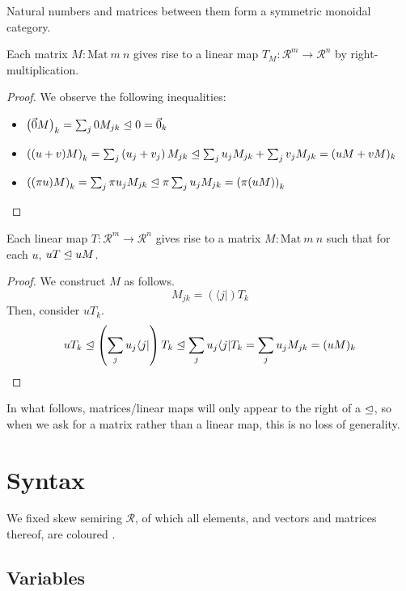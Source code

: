 \documentclass[submission,copyright,creativecommons]{eptcs}
\begin{document}
\begin{lemma}
  Natural numbers and matrices between them form a symmetric monoidal category.
\end{lemma}

\begin{lemma}
  Each matrix $M : \mathrm{Mat}~m~n$ gives rise to a linear map
  $T_M : \mathscr R^m \to \mathscr R^n$ by right-multiplication.
\end{lemma}
\begin{proof}
  We observe the following inequalities:
  \begin{itemize}
  \item $\left(\vec 0M\right)_{k} = \sum_j 0M_{jk} \trianglelefteq 0 = \vec 0_{k}$
  \item $\left((u + v)M\right)_{k} = \sum_j \left(u_j + v_j\right)M_{jk} \trianglelefteq
    \sum_j u_jM_{jk} + \sum_j v_jM_{jk} = (uM + vM)_{k}$
  \item $\left((\pi u)M\right)_{k} = \sum_j \pi u_jM_{jk} \trianglelefteq
    \pi\sum_j u_jM_{jk} = \left(\pi(uM)\right)_{k}$
  \end{itemize}
\end{proof}

\begin{lemma}
  Each linear map $T : \mathscr R^m \to \mathscr R^n$ gives rise to a matrix
  $M : \mathrm{Mat}~m~n$ such that for each $u$, $uT \trianglelefteq uM$.
\end{lemma}
\begin{proof}
  We construct $M$ as follows.
  \[
    M_{jk} = (\langle j \rvert)T_k
  \]
  Then, consider $uT_k$.
  \[
    uT_k \trianglelefteq \left(\sum_j u_j\langle j \rvert\right)T_k
    \trianglelefteq \sum_j u_j\langle j \rvert T_k
    = \sum_j u_j M_{jk} = (uM)_k
  \]
\end{proof}

In what follows, matrices/linear maps will only appear to the right of a
$\trianglelefteq$, so when we ask for a matrix rather than a linear map, this is no loss
of generality.

\section{Syntax}

We fixed skew semiring $\mathscr R$, of which all elements, and vectors and
matrices thereof, are coloured .

\subsection{Variables}
\end{document}
